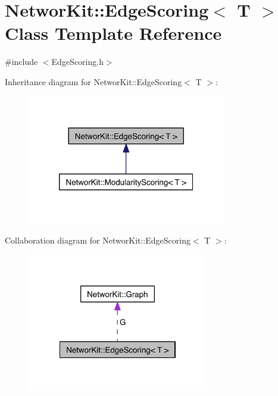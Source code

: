 \hypertarget{class_networ_kit_1_1_edge_scoring}{\section{Networ\-Kit\-:\-:Edge\-Scoring$<$ T $>$ Class Template Reference}
\label{class_networ_kit_1_1_edge_scoring}
}


{\ttfamily \#include $<$Edge\-Scoring.\-h$>$}



Inheritance diagram for Networ\-Kit\-:\-:Edge\-Scoring$<$ T $>$\-:\nopagebreak
\begin{figure}[H]
\begin{center}
\leavevmode
\includegraphics[width=246pt]{class_networ_kit_1_1_edge_scoring__inherit__graph}
\end{center}
\end{figure}


Collaboration diagram for Networ\-Kit\-:\-:Edge\-Scoring$<$ T $>$\-:\nopagebreak
\begin{figure}[H]
\begin{center}
\leavevmode
\includegraphics[width=224pt]{class_networ_kit_1_1_edge_scoring__coll__graph}
\end{center}
\end{figure}
